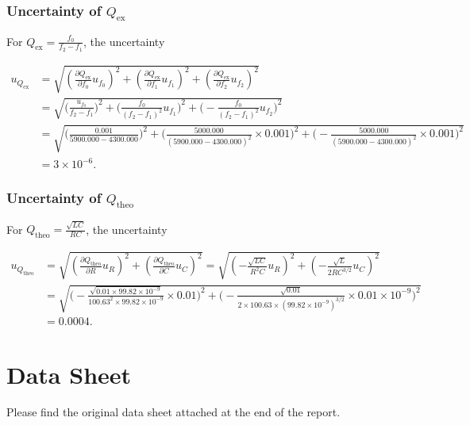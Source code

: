 \documentclass{article}
\begin{document}
\subsubsection*{Uncertainty of $Q_\text{ex}$}

For $Q_\text{ex} = \frac{f_0}{f_2 - f_1}$, the uncertainty

\begin{align*}
    u_{Q_\text{ex}} & = \sqrt{(\frac{\partial Q_\text{ex}}{\partial f_0}u_{f_0})^2 + (\frac{\partial Q_\text{ex}}{\partial f_1}u_{f_1})^2 + (\frac{\partial Q_\text{ex}}{\partial f_2}u_{f_2})^2}                 \\
                    & = \sqrt{\bigg(\frac{u_{f_0}}{f_2-f_1}\bigg)^2 + \bigg(\frac{f_0}{(f_2-f_1)^2}u_{f_1}\bigg)^2 + \bigg(-\frac{f_0}{(f_2-f_1)^2}u_{f_2}\bigg)^2}                                               \\
                    & = \sqrt{\bigg(\frac{0.001}{5900.000-4300.000}\bigg)^2 + \bigg(\frac{5000.000}{(5900.000-4300.000)^2}\times0.001\bigg)^2 + \bigg(-\frac{5000.000}{(5900.000-4300.000)^2}\times0.001\bigg)^2} \\
                    & = 3 \times 10^{-6}.
\end{align*}


\subsubsection*{Uncertainty of $Q_\text{theo}$}

For $Q_\text{theo} = \frac{\sqrt{LC}}{RC}$, the uncertainty

\begin{align*}
    u_{Q_{\text{theo}}} & = \sqrt{(\frac{\partial Q_{\text{theo}}}{\partial R}u_R)^2 + (\frac{\partial Q_{\text{theo}}}{\partial C}u_C)^2} = \sqrt{(-\frac{\sqrt{LC}}{R^2C}u_R)^2 + (-\frac{\sqrt{L}}{2RC^{3/2}} u_C)^2}                                     \\
                        & = \sqrt{\bigg(-\frac{\sqrt{0.01\times 99.82\times 10^{-9}}}{100.63^2\times 99.82\times 10^{-9}}\times 0.01\bigg)^2 + \bigg(-\frac{\sqrt{0.01}}{2\times 100.63\times(99.82\times 10^{-9})^{3/2}}\times 0.01 \times 10^{-9}\bigg)^2} \\
                        & = 0.0004.
\end{align*}

\section{Data Sheet}

Please find the original data sheet attached at the end of the report.


\end{document}

